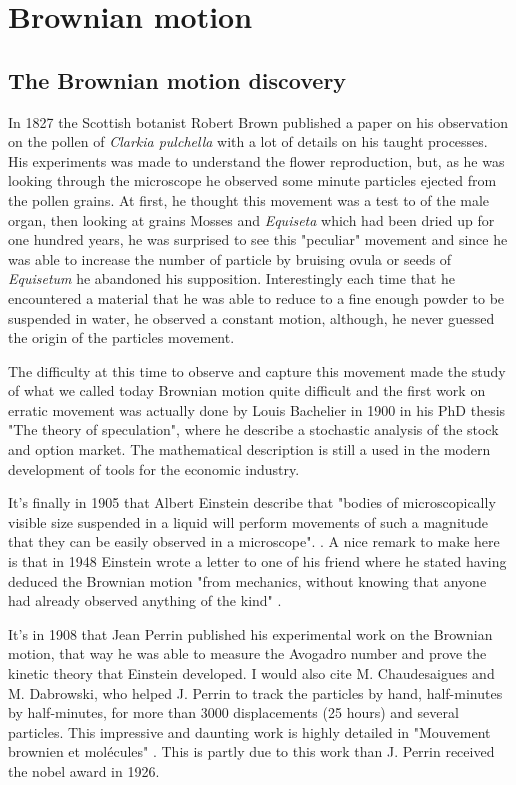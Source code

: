 \section{Brownian motion}
	\label{sec:chapter1}
	
\subsection{The Brownian motion discovery}

	
In 1827 the Scottish botanist Robert Brown published a paper \cite{robert_xxvii_1828} on his observation on the pollen of \textit{Clarkia pulchella} with a lot of details on his taught processes. His experiments was made to understand the flower reproduction, but, as he was looking through the microscope he observed some minute particles ejected from the pollen grains. At first, he thought this movement was a test to of the male organ, then looking at grains Mosses and \textit{Equiseta} which had been dried up for one hundred years, he was surprised to see this "peculiar" movement and since he was able to increase the number of particle by bruising ovula or seeds of \textit{Equisetum} he abandoned his supposition. Interestingly each time that he encountered a material that he was able to reduce to a fine enough powder to be suspended in water, he observed a constant motion, although, he never guessed the origin of the particles movement.

The difficulty at this time to observe and capture this movement made the study of what we called today Brownian motion quite difficult and the first work on erratic movement was actually done by Louis Bachelier  in 1900 in his PhD thesis "The theory of speculation", where he describe a stochastic analysis of the stock and option market. The mathematical description is still a used in the modern development of tools for the economic industry. 

It's finally in 1905 that Albert Einstein describe that "bodies of microscopically visible size suspended in a liquid will perform movements of such a magnitude that they can be easily observed in a microscope". \cite{einstein_uber_1905}. A nice remark to make here is that in 1948 Einstein wrote a letter to one of his friend where he stated having deduced the Brownian motion "from mechanics, without knowing that anyone had already observed anything of the kind" \cite{peter_brownian_nodate}.

It's in 1908 that Jean Perrin published his experimental work on the Brownian motion, that way he was able to measure the Avogadro number and prove the kinetic theory that Einstein developed. I would also cite M. Chaudesaigues and M. Dabrowski, who helped J. Perrin to track the particles by hand, half-minutes by half-minutes, for more than 3000 displacements (25 hours) and several particles. This impressive and daunting work is highly detailed in "Mouvement brownien et molécules" \cite{perrin_mouvement_1910}. This is partly due to this work than J. Perrin received the nobel award in 1926.

